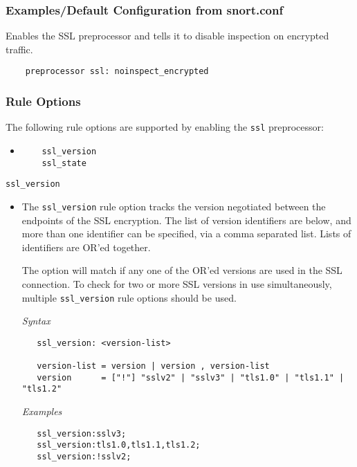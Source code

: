 \documentclass[english]{report}
\begin{document}
\subsubsection{Examples/Default Configuration from snort.conf}

Enables the SSL preprocessor and tells it to disable inspection on encrypted
traffic.

\begin{verbatim}
    preprocessor ssl: noinspect_encrypted
\end{verbatim}

\subsubsection{Rule Options}

The following rule options are supported by enabling the \texttt{ssl} preprocessor:

\begin{itemize}
\item[]
\begin{verbatim}
    ssl_version
    ssl_state
\end{verbatim}
\end{itemize}

\texttt{ssl\_version}
\label{ssl:ssl_version}
\begin{itemize}

\item[] The \texttt{ssl\_version} rule option tracks the version negotiated between
the endpoints of the SSL encryption.  The list of version identifiers are below, and
more than one identifier can be specified, via a comma separated list.  Lists of
identifiers are OR'ed together.

The option will match if any one of the OR'ed versions are used in the SSL
connection.  To check for two or more SSL versions in use simultaneously, multiple
\texttt{ssl\_version} rule options should be used.

\textit{Syntax}
\footnotesize
\begin{verbatim}
   ssl_version: <version-list>

   version-list = version | version , version-list
   version      = ["!"] "sslv2" | "sslv3" | "tls1.0" | "tls1.1" | "tls1.2"
\end{verbatim}

\textit{Examples}
\begin{verbatim}
   ssl_version:sslv3;
   ssl_version:tls1.0,tls1.1,tls1.2;
   ssl_version:!sslv2;
\end{verbatim}

\end{itemize}
\end{document}
